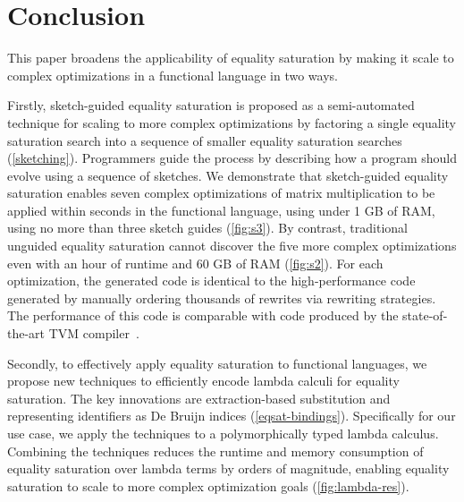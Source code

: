 \section{Conclusion}

This paper broadens the applicability of equality saturation by making it scale to complex optimizations in a functional language in two ways.

Firstly, sketch-guided equality saturation is proposed as a semi-automated technique for scaling to more complex optimizations by factoring a single equality saturation search into a sequence of smaller equality saturation searches (\cref{sketching}).
Programmers guide the process by describing how a program should evolve using a sequence of sketches.
We demonstrate that sketch-guided equality saturation enables seven complex optimizations of matrix multiplication to be applied within seconds in the \Rise{} functional language, using under 1 GB of RAM, using no more than three sketch guides (\cref{fig:s3}).
By contrast, traditional unguided equality saturation cannot discover the five more complex optimizations even with an hour of runtime and 60 GB of RAM (\cref{fig:s2}).
For each optimization, the generated code is identical to the high-performance code generated by manually ordering thousands of rewrites via rewriting strategies.
The performance of this code is comparable with code produced by the state-of-the-art TVM compiler~\cite{hagedorn2020-elevate}.

Secondly, to effectively apply equality saturation to functional languages, we propose new techniques to efficiently encode lambda calculi for equality saturation. 
The key innovations are extraction-based substitution and representing identifiers as De Bruijn indices (\cref{eqsat-bindings}). Specifically for our  \Rise{} use case, we apply the techniques to a polymorphically typed lambda calculus. Combining the techniques reduces the runtime and memory consumption of equality saturation over lambda terms by orders of magnitude, enabling equality saturation to scale to more complex optimization goals  (\cref{fig:lambda-res}).

\medskip

